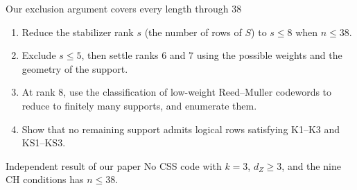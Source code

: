 \documentclass[aspectratio=169,11pt]{beamer}
\newcommand{\talktext}{\small\setlength{\parskip}{2.5pt}\setlength{\abovedisplayskip}{5pt}\setlength{\belowdisplayskip}{5pt}\setlength{\abovedisplayshortskip}{3pt}\setlength{\belowdisplayshortskip}{3pt}}
\begin{document}
\begin{frame}[label=floor38]{Our exclusion argument covers every length through 38}
\talktext
\begin{enumerate}\setlength{\itemsep}{6pt}
\item Reduce the stabilizer rank $s$ (the number of rows of $S$) to $s\le8$ when $n\le38$.
\item Exclude $s\le5$, then settle ranks 6 and 7 using the possible weights and the geometry of the support.
\item At rank 8, use the classification of low-weight Reed--Muller codewords to reduce to finitely many supports, and enumerate them.
\item Show that no remaining support admits logical rows satisfying K1--K3 and KS1--KS3.
\end{enumerate}
\begin{block}{Independent result of our paper}
No CSS code with $k=3$, $d_Z\ge3$, and the nine CH conditions has $n\le38$.
\end{block}
\end{frame}
\end{document}
